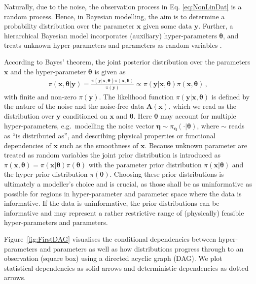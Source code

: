 Naturally, due to the noise, the observation process in Eq. \ref{eq:NonLinDat} is a random process.
Hence, in Bayesian modelling, the aim is to determine a probability distribution over the parameter $\bm{x}$ given some data $\bm{y}$.
Further, a hierarchical Bayesian model incorporates (auxiliary) hyper-parameters $\bm{\theta}$, and treats unknown hyper-parameters and parameters as random variables \cite[Chapter 3]{kaipio2005statinv}.

According to Bayes' theorem, the joint posterior distribution over the parameters $\bm{x}$ and the hyper-parameter $\bm{\theta}$ is given as
\begin{align}
	\pi(\bm{x},\bm{\theta}|\bm{y}) = \frac{ \pi(\bm{y} | \bm{x}, \bm{\theta} ) \pi(\bm{x}, \bm{\theta})}{\pi(\bm{y})} \propto \pi(\bm{y} | \bm{x}, \bm{\theta} ) \pi(\bm{x}, \bm{\theta}) \, ,
\end{align}
with finite and non-zero $\pi(\bm{y})$.
The likelihood function $\pi(\bm{y}|\bm{x},\bm{\theta})$ is defined by the nature of the noise and the noise-free data $\bm{A}(\bm{x})$, which we read as the distribution over $\bm{y}$ conditioned on $\bm{x}$ and $\bm{\theta}$.
Here $\bm{\theta}$ may account for multiple hyper-parameters, e.g.~modelling the noise vector $\bm{\eta} \sim \pi_{\bm{\eta}}(\cdot|\bm{\theta})$, where $\sim$ reads as ``is distributed as'', and describing physical properties or functional dependencies of $\bm{x}$ such as the smoothness of $\bm{x}$.
Because unknown parameter are treated as random variables the joint prior distribution is introduced as $\pi(\bm{x}, \bm{\theta}) = \pi(\bm{x}|\bm{\theta}) \pi(\bm{\theta})$ with the parameter prior distribution $\pi(\bm{x}|\bm{\theta})$ and the hyper-prior distribution $\pi(\bm{\theta})$.
Choosing these prior distributions is ultimately a modeller's choice and is crucial, as those shall be as uninformative as possible for regions in hyper-parameter and parameter space where the data is informative.
If the data is uninformative, the prior distributions can be informative and may represent a rather restrictive range of (physically) feasible hyper-parameters and parameters.

Figure~\ref{fig:FirstDAG} visualises the conditional dependencies between hyper-parameters and parameters as well as how distributions progress through to an observation (square box) using a directed acyclic graph (DAG).
We plot statistical dependencies as solid arrows and deterministic dependencies as dotted arrows.

